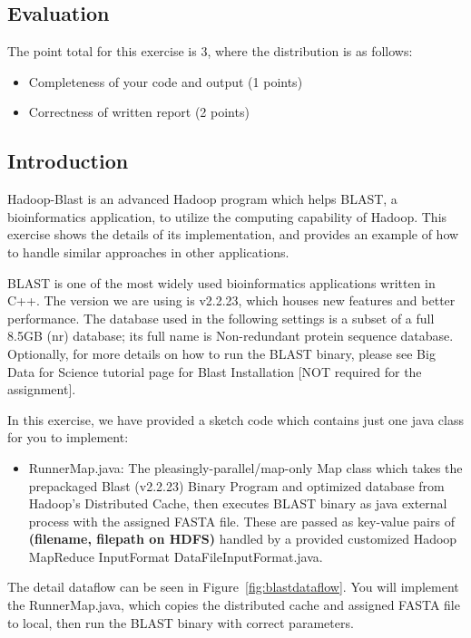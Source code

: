 \subsection{Evaluation} 

The point total for this exercise is 3, where the distribution is as follows:
\begin{itemize} 
\item	Completeness of your code and output (1 points)
\item	Correctness of written report (2 points)
\end{itemize}

\subsection{Introduction}   

Hadoop-Blast is an advanced Hadoop program which helps BLAST, a bioinformatics
application, to utilize the computing capability of Hadoop. This exercise shows
the details of its implementation, and provides an example of how to handle
similar approaches in other applications.

BLAST is one of the most widely used bioinformatics applications written in
C++. The version we are using is v2.2.23, which houses new features and better
performance. The database used in the following settings is a subset of a full
8.5GB (nr) database; its full name is Non-redundant protein sequence database.
Optionally, for more details on how to run the BLAST binary, please see Big
Data for Science tutorial page for Blast Installation [NOT required for the
assignment].

In this exercise, we have provided a sketch code which contains just one java
class for you to implement:

\begin{itemize}
\item RunnerMap.java: The pleasingly-parallel/map-only Map class which takes
the prepackaged Blast (v2.2.23) Binary Program and optimized database from
Hadoop's Distributed Cache, then executes BLAST binary as java external process
with the assigned FASTA file. These are passed as key-value pairs of
\textbf{(filename, filepath on HDFS)} handled by a provided customized Hadoop
MapReduce InputFormat DataFileInputFormat.java.  
\end{itemize}

The detail dataflow can be seen in Figure~\ref{fig:blastdataflow}. You will
implement the RunnerMap.java, which copies the distributed cache and assigned
FASTA file to local, then run the BLAST binary with correct parameters.

